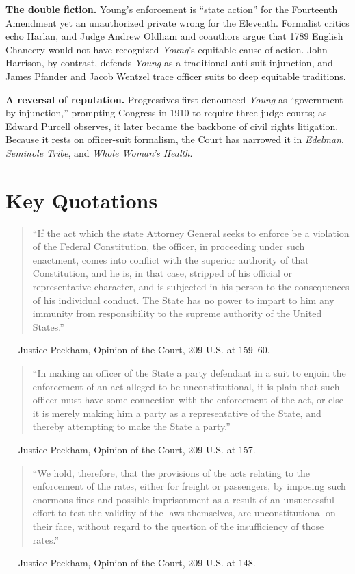 \documentclass[12pt]{article}
\begin{document}
\textbf{The double fiction.} Young's enforcement is ``state action'' for the Fourteenth Amendment yet an unauthorized private wrong for the Eleventh. Formalist critics echo Harlan, and Judge Andrew Oldham and coauthors argue that 1789 English Chancery would not have recognized \textit{Young}'s equitable cause of action. John Harrison, by contrast, defends \textit{Young} as a traditional anti-suit injunction, and James Pfander and Jacob Wentzel trace officer suits to deep equitable traditions.

\textbf{A reversal of reputation.} Progressives first denounced \textit{Young} as ``government by injunction,'' prompting Congress in 1910 to require three-judge courts; as Edward Purcell observes, it later became the backbone of civil rights litigation. Because it rests on officer-suit formalism, the Court has narrowed it in \textit{Edelman}, \textit{Seminole Tribe}, and \textit{Whole Woman's Health}.

\section{Key Quotations}

\begin{quote}
``If the act which the state Attorney General seeks to enforce be a violation of the Federal Constitution, the officer, in proceeding under such enactment, comes into conflict with the superior authority of that Constitution, and he is, in that case, stripped of his official or representative character, and is subjected in his person to the consequences of his individual conduct. The State has no power to impart to him any immunity from responsibility to the supreme authority of the United States.''
\end{quote}
\noindent --- Justice Peckham, Opinion of the Court, 209 U.S. at 159--60.

\begin{quote}
``In making an officer of the State a party defendant in a suit to enjoin the enforcement of an act alleged to be unconstitutional, it is plain that such officer must have some connection with the enforcement of the act, or else it is merely making him a party as a representative of the State, and thereby attempting to make the State a party.''
\end{quote}
\noindent --- Justice Peckham, Opinion of the Court, 209 U.S. at 157.

\begin{quote}
``We hold, therefore, that the provisions of the acts relating to the enforcement of the rates, either for freight or passengers, by imposing such enormous fines and possible imprisonment as a result of an unsuccessful effort to test the validity of the laws themselves, are unconstitutional on their face, without regard to the question of the insufficiency of those rates.''
\end{quote}
\noindent --- Justice Peckham, Opinion of the Court, 209 U.S. at 148.
\end{document}
